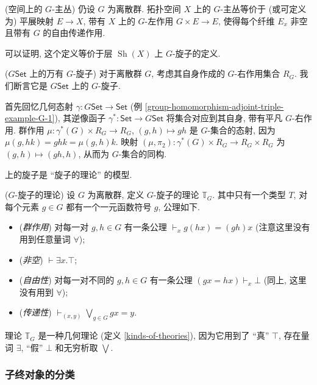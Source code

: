 \begin{example}
	{(空间上的 $G$-主丛)}
	仍设 $G$ 为离散群. 拓扑空间 $X$ 上的 $G$-主丛等价于 (或可定义为) 平展映射 $E \to X$, 带有 $X$ 上的 $G$-左作用 $G\times E \to E$, 使得每个纤维 $E_x$ 非空且带有 $G$ 的自由传递作用.
	
	可以证明, 这个定义等价于层\topos{} $\operatorname{Sh}(X)$ 上 $G$-旋子的定义.
\end{example}

\begin{example}
	{($G\mathsf {Set}$ 上的万有 $G$-旋子)}
	对于离散群 $G$, 考虑其自身作成的 $G$-右作用集合 $R_G$. 我们断言它是 $G\mathsf {Set}$ 上的 $G$-旋子.
	
	首先回忆几何态射 $\gamma\colon G\mathsf {Set} \to \mathsf {Set}$ (例 \ref{group-homomorphism-adjoint-triple-example-G-1}),
	其逆像函子 $\gamma^*\colon \mathsf {Set} \to G\mathsf {Set}$
	将集合对应到其自身, 带有平凡 $G$-右作用.
	群作用 $\mu\colon \gamma^*(G)\times R_G \to R_G$, $(g,h)\mapsto gh$ 是 $G$-集合的态射, 因为 $\mu(g,hk)=ghk=\mu(g,h)k$.
	映射 $(\mu,\pi_2)\colon \gamma^*(G)\times R_G\to R_G\times R_G$ 为 $(g,h)\mapsto (gh,h)$, 从而为 $G$-集合的同构.
\end{example}

\topos{}上的旋子是 ``旋子的理论'' 的模型.

\begin{definition}
	{($G$-旋子的理论)}
	设 $G$ 为离散群, 定义 $G$-旋子的理论 $\mathbb T_G$.
	其中只有一个类型 $T$, 对每个元素 $g\in G$ 都有一个一元函数符号 $g$, 公理如下.
	\begin{itemize}
		\item (\emph{群作用}) 对每一对 $g,h\in G$ 有一条公理 $\vdash_x g(hx)=(gh)x$ (注意这里没有用到任意量词 $\forall$);
		\item (\emph{非空}) $\vdash \exists x. \top$;
		\item (\emph{自由性}) 对每一对不同的 $g,h\in G$ 有一条公理 $(gx=hx)\vdash_x \bot$ (同上, 这里没有用到 $\forall$);
		\item (\emph{传递性}) $\displaystyle\vdash_{(x,y)}\bigvee_{g\in G}gx=y$.
	\end{itemize}
\end{definition}

理论 $\mathbb T_G$ 是一种几何理论 (定义 \ref{kinds-of-theories}), 因为它用到了 ``真'' $\top$, 存在量词 $\exists$, ``假'' $\bot$ 和无穷析取 $\bigvee$.

\subsubsection{子终对象的分类\topos}

